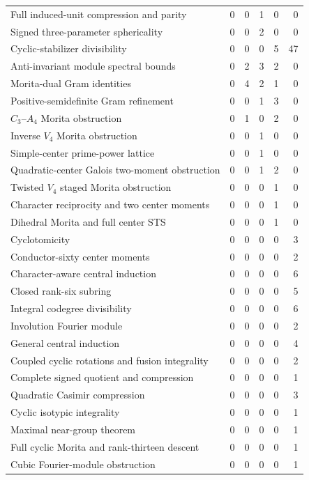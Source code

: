 {\begin{longtable}{@{}l r r r r r @{}}
Full induced-unit compression and parity & 0 & 0 & 1 & 0 & 0\\
Signed three-parameter sphericality & 0 & 0 & 2 & 0 & 0\\
Cyclic-stabilizer divisibility & 0 & 0 & 0 & 5 & 47\\
Anti-invariant module spectral bounds & 0 & 2 & 3 & 2 & 0\\
Morita-dual Gram identities & 0 & 4 & 2 & 1 & 0\\
Positive-semidefinite Gram refinement & 0 & 0 & 1 & 3 & 0\\
$C_3$--$A_4$ Morita obstruction & 0 & 1 & 0 & 2 & 0\\
Inverse $V_4$ Morita obstruction & 0 & 0 & 1 & 0 & 0\\
Simple-center prime-power lattice & 0 & 0 & 1 & 0 & 0\\
Quadratic-center Galois two-moment obstruction & 0 & 0 & 1 & 2 & 0\\
Twisted $V_4$ staged Morita obstruction & 0 & 0 & 0 & 1 & 0\\
Character reciprocity and two center moments & 0 & 0 & 0 & 1 & 0\\
Dihedral Morita and full center STS & 0 & 0 & 0 & 1 & 0\\
Cyclotomicity & 0 & 0 & 0 & 0 & 3\\
Conductor-sixty center moments & 0 & 0 & 0 & 0 & 2\\
Character-aware central induction & 0 & 0 & 0 & 0 & 6\\
Closed rank-six subring & 0 & 0 & 0 & 0 & 5\\
Integral codegree divisibility & 0 & 0 & 0 & 0 & 6\\
Involution Fourier module & 0 & 0 & 0 & 0 & 2\\
General central induction & 0 & 0 & 0 & 0 & 4\\
Coupled cyclic rotations and fusion integrality & 0 & 0 & 0 & 0 & 2\\
Complete signed quotient and compression & 0 & 0 & 0 & 0 & 1\\
Quadratic Casimir compression & 0 & 0 & 0 & 0 & 3\\
Cyclic isotypic integrality & 0 & 0 & 0 & 0 & 1\\
Maximal near-group theorem & 0 & 0 & 0 & 0 & 1\\
Full cyclic Morita and rank-thirteen descent & 0 & 0 & 0 & 0 & 1\\
Cubic Fourier-module obstruction & 0 & 0 & 0 & 0 & 1\\
\end{longtable}
}

